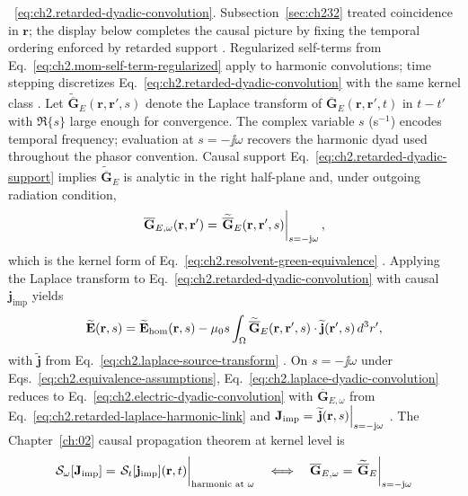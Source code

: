 ~\eqref{eq:ch2.retarded-dyadic-convolution}.
Subsection~\ref{sec:ch232} treated coincidence in \(\mathbf{r}\); the display below
completes the causal picture by fixing the temporal ordering enforced by retarded support
\cite{stratton1941}. Regularized self-terms from
Eq.~\eqref{eq:ch2.mom-self-term-regularized} apply to harmonic convolutions; time
stepping discretizes Eq.~\eqref{eq:ch2.retarded-dyadic-convolution} with the same
kernel class \cite{harrington2001}. Let \(\widetilde{\overline{\mathbf{G}}}_{E}(\mathbf{r},\mathbf{r}',s)\) denote the
Laplace transform of \(\overline{\mathbf{G}}_{E}(\mathbf{r},\mathbf{r}',t)\) in
\(t-t'\) with \(\Re\{s\}\) large enough for convergence.
The complex variable \(s\) (s\(^{-1}\)) encodes temporal frequency; evaluation at
\(s=-\jj\omega\) recovers the harmonic dyad used throughout the phasor convention.
Causal support
Eq.~\eqref{eq:ch2.retarded-dyadic-support} implies
\(\widetilde{\overline{\mathbf{G}}}_{E}\) is analytic in the right half-plane and,
under outgoing radiation condition,
\begin{equation}
\label{eq:ch2.retarded-laplace-harmonic-link}
\overline{\mathbf{G}}_{E,\omega}(\mathbf{r},\mathbf{r}')
=
\eval{\widetilde{\overline{\mathbf{G}}}_{E}(\mathbf{r},\mathbf{r}',s)}_{s=-\jj\omega},
\end{equation}
which is the kernel form of Eq.~\eqref{eq:ch2.resolvent-green-equivalence}
\cite{stratton1941}. Applying the Laplace transform to
Eq.~\eqref{eq:ch2.retarded-dyadic-convolution} with causal
\(\mathbf{j}_{\mathrm{imp}}\) yields
\begin{equation}
\label{eq:ch2.laplace-dyadic-convolution}
\widetilde{\mathbf{E}}(\mathbf{r},s)
=
\widetilde{\mathbf{E}}_{\mathrm{hom}}(\mathbf{r},s)
-\mu_0 s\int_{\Omega}
\widetilde{\overline{\mathbf{G}}}_{E}(\mathbf{r},\mathbf{r}',s)\cdot
\widetilde{\mathbf{j}}(\mathbf{r}',s)\,d^{3}r',
\end{equation}
with \(\widetilde{\mathbf{j}}\) from Eq.~\eqref{eq:ch2.laplace-source-transform}
\cite{stratton1941}. On \(s=-\jj\omega\) under Eqs.~\eqref{eq:ch2.equivalence-assumptions},
Eq.~\eqref{eq:ch2.laplace-dyadic-convolution} reduces to
Eq.~\eqref{eq:ch2.electric-dyadic-convolution} with
\(\overline{\mathbf{G}}_{E,\omega}\) from Eq.~\eqref{eq:ch2.retarded-laplace-harmonic-link}
and \(\Jimp=\eval{\widetilde{\mathbf{j}}(\mathbf{r},s)}_{s=-\jj\omega}\)
\cite{harrington2001}. The Chapter~\ref{ch:02} causal propagation theorem at kernel
level is
\begin{equation}
\label{eq:ch2.retarded-harmonic-kernel-theorem}
\mathcal{S}_\omega[\Jimp]
=
\eval{\mathcal{S}_t[\mathbf{j}_{\mathrm{imp}}](\mathbf{r},t)}_{\text{harmonic at }\omega}
\quad\Longleftrightarrow\quad
\overline{\mathbf{G}}_{E,\omega}
=
\eval{\widetilde{\overline{\mathbf{G}}}_{E}}_{s=-\jj\omega}
\end{equation}
